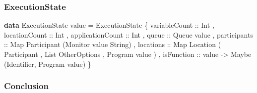 \documentclass[12pt]{beamer}
\newenvironment{Shaded}{}{}
\newcommand{\KeywordTok}[1]{\textcolor[rgb]{0.00,0.44,0.13}{\textbf{#1}}}
\newcommand{\DataTypeTok}[1]{\textcolor[rgb]{0.56,0.13,0.00}{#1}}
\newcommand{\OtherTok}[1]{\textcolor[rgb]{0.00,0.44,0.13}{#1}}
\newcommand{\FunctionTok}[1]{\textcolor[rgb]{0.02,0.16,0.49}{#1}}
\newcommand{\NormalTok}[1]{#1}
\begin{document}
\begin{frame}[fragile]
\frametitle{ExecutionState}

\begin{Shaded}
\begin{Highlighting}[]
\KeywordTok{data} \DataTypeTok{ExecutionState}\NormalTok{ value }\FunctionTok{=} 
    \DataTypeTok{ExecutionState} 
\NormalTok{        \{}\OtherTok{ variableCount ::} \DataTypeTok{Int}
\NormalTok{        ,}\OtherTok{ locationCount ::} \DataTypeTok{Int}
\NormalTok{        ,}\OtherTok{ applicationCount ::} \DataTypeTok{Int}
\NormalTok{        ,}\OtherTok{ queue ::} \DataTypeTok{Queue}\NormalTok{ value}
\NormalTok{        ,}\OtherTok{ participants ::} \DataTypeTok{Map} \DataTypeTok{Participant}\NormalTok{ (}\DataTypeTok{Monitor}\NormalTok{ value }\DataTypeTok{String}\NormalTok{)}
\NormalTok{        ,}\OtherTok{ locations ::} \DataTypeTok{Map} \DataTypeTok{Location}
                \NormalTok{( }\DataTypeTok{Participant}
                \NormalTok{, }\DataTypeTok{List} \DataTypeTok{OtherOptions}
                \NormalTok{, }\DataTypeTok{Program}\NormalTok{ value}
                \NormalTok{) }
\NormalTok{        ,}\OtherTok{ isFunction ::}\NormalTok{ value }\OtherTok{->} \DataTypeTok{Maybe}\NormalTok{ (}\DataTypeTok{Identifier}\NormalTok{, }\DataTypeTok{Program}\NormalTok{ value)}
\NormalTok{        \}}
\end{Highlighting}
\end{Shaded}

\end{frame}


\begin{frame}[fragile]
\frametitle{Conclusion}
\end{frame}
\end{document}
